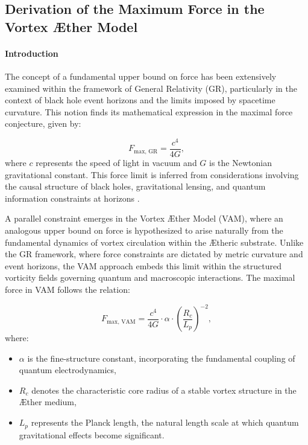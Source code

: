 
\subsection{Derivation of the Maximum Force in the Vortex \AE ther Model}

\paragraph*{Introduction}
The concept of a fundamental upper bound on force has been extensively examined within the framework of General Relativity (GR), particularly in the context of black hole event horizons and the limits imposed by spacetime curvature. This notion finds its mathematical expression in the maximal force conjecture, given by:


\begin{equation*}
F_{\text{max, GR}} = \frac{c^4}{4G},
\end{equation*}
where $c$ represents the speed of light in vacuum and $G$ is the Newtonian gravitational constant. This force limit is inferred from considerations involving the causal structure of black holes, gravitational lensing, and quantum information constraints at horizons \cite{Schiller2006}.


A parallel constraint emerges in the Vortex \AE ther Model (VAM), where an analogous upper bound on force is hypothesized to arise naturally from the fundamental dynamics of vortex circulation within the \AE theric substrate. Unlike the GR framework, where force constraints are dictated by metric curvature and event horizons, the VAM approach embeds this limit within the structured vorticity fields governing quantum and macroscopic interactions. The maximal force in VAM follows the relation:


\begin{equation*}
F_{\text{max, VAM}} = \frac{c^4}{4G} \cdot \alpha \cdot \left(\frac{R_c}{L_p}\right)^{-2},
\end{equation*}
where:
\begin{itemize}
\item $\alpha$ is the fine-structure constant, incorporating the fundamental coupling of quantum electrodynamics,
\item $R_c$ denotes the characteristic core radius of a stable vortex structure in the \AE ther medium,
\item $L_p$ represents the Planck length, the natural length scale at which quantum gravitational effects become significant.
\end{itemize}


